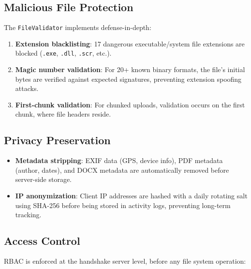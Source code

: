 \documentclass[12pt, a4paper]{article}
\begin{document}
\subsection{Malicious File Protection}

The \texttt{FileValidator} implements defense-in-depth:

\begin{enumerate}[label=\arabic*., itemsep=2pt]
    \item \textbf{Extension blacklisting}: 17 dangerous executable/system file extensions are blocked (\texttt{.exe}, \texttt{.dll}, \texttt{.scr}, etc.).
    \item \textbf{Magic number validation}: For 20+ known binary formats, the file's initial bytes are verified against expected signatures, preventing extension spoofing attacks.
    \item \textbf{First-chunk validation}: For chunked uploads, validation occurs on the first chunk, where file headers reside.
\end{enumerate}

\subsection{Privacy Preservation}

\begin{itemize}[itemsep=2pt]
    \item \textbf{Metadata stripping}: EXIF data (GPS, device info), PDF metadata (author, dates), and DOCX metadata are automatically removed before server-side storage.
    \item \textbf{IP anonymization}: Client IP addresses are hashed with a daily rotating salt using SHA-256 before being stored in activity logs, preventing long-term tracking.
\end{itemize}

\subsection{Access Control}

RBAC is enforced at the handshake server level, before any file system operation:
\end{document}
